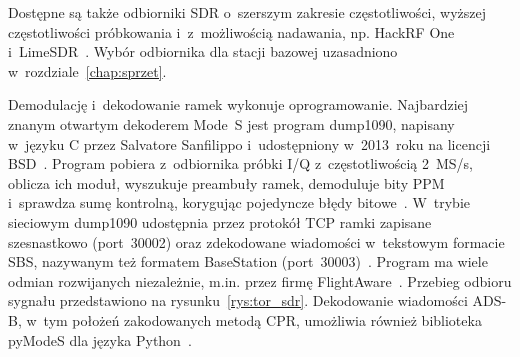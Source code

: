 Dostępne są także odbiorniki SDR o~szerszym zakresie częstotliwości, wyższej częstotliwości próbkowania i~z~możliwością nadawania, np. HackRF One i~LimeSDR~\cite{sun2021}. Wybór odbiornika dla stacji bazowej uzasadniono w~rozdziale~\ref{chap:sprzet}.

Demodulację i~dekodowanie ramek wykonuje oprogramowanie. Najbardziej znanym otwartym dekoderem Mode~S jest program dump1090, napisany w~języku C przez Salvatore Sanfilippo i~udostępniony w~2013~roku na licencji BSD~\cite{sun2021}. Program pobiera z~odbiornika próbki I/Q z~częstotliwością \SI{2}{MS/s}, oblicza ich moduł, wyszukuje preambuły ramek, demoduluje bity PPM i~sprawdza sumę kontrolną, korygując pojedyncze błędy bitowe~\cite{dump1090}. W~trybie sieciowym dump1090 udostępnia przez protokół TCP ramki zapisane szesnastkowo (port~30002) oraz zdekodowane wiadomości w~tekstowym formacie SBS, nazywanym też formatem BaseStation (port~30003)~\cite{dump1090}. Program ma wiele odmian rozwijanych niezależnie, m.in. przez firmę FlightAware~\cite{sun2021}. Przebieg odbioru sygnału przedstawiono na rysunku~\ref{rys:tor_sdr}. Dekodowanie wiadomości ADS-B, w~tym położeń zakodowanych metodą CPR, umożliwia również biblioteka pyModeS dla języka Python~\cite{sun2020pymodes}.


